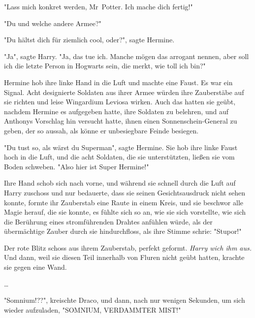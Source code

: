 {"Lass mich konkret werden, Mr~Potter. Ich mache dich fertig!"

"Du und welche andere Armee?"

"Du hältst dich für ziemlich cool, oder?", sagte Hermine.

"Ja", sagte Harry. "Ja, das tue ich. Manche mögen das arrogant nennen, aber soll ich die letzte Person in Hogwarts sein, die merkt, wie toll ich bin?"

Hermine hob ihre linke Hand in die Luft und machte eine Faust. Es war ein Signal. Acht designierte Soldaten aus ihrer Armee würden ihre Zauberstäbe auf sie richten und leise Wingardium Leviosa wirken. Auch das hatten sie geübt, nachdem Hermine es aufgegeben hatte, ihre Soldaten zu belehren, und auf Anthonys Vorschlag hin versucht hatte, ihnen einen Sonnenschein-General zu geben, der so aussah, als könne er unbesiegbare Feinde besiegen.

"Du tust so, als wärst du Superman", sagte Hermine. Sie hob ihre linke Faust hoch in die Luft, und die acht Soldaten, die sie unterstützten, ließen sie vom Boden schweben. "Also hier ist Super Hermine!"

Ihre Hand schob sich nach vorne, und während sie schnell durch die Luft auf Harry zuschoss und nur bedauerte, dass sie seinen Gesichtsausdruck nicht sehen konnte, formte ihr Zauberstab eine Raute in einem Kreis, und sie beschwor alle Magie herauf, die sie konnte, es fühlte sich so an, wie sie sich vorstellte, wie sich die Berührung eines stromführenden Drahtes anfühlen würde, als der übermächtige Zauber durch sie hindurchfloss, als ihre Stimme schrie: "Stupor!"

Der rote Blitz schoss aus ihrem Zauberstab, perfekt geformt. \emph{Harry wich ihm aus.} Und dann, weil sie diesen Teil innerhalb von Fluren nicht geübt hatten, krachte sie gegen eine Wand.

…

"Somnium!??", kreischte Draco, und dann, nach nur wenigen Sekunden, um sich wieder aufzuladen, "SOMNIUM, VERDAMMTER MIST!"

}
